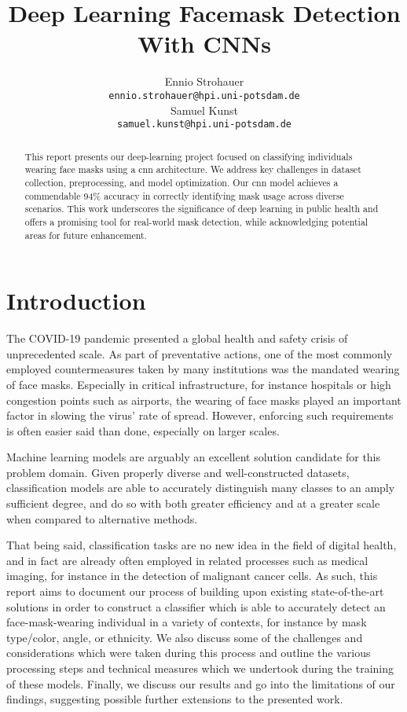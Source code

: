 \documentclass{article}
\title{Deep Learning Facemask Detection With CNNs}
\author{
  Ennio Strohauer\\
  \texttt{ennio.strohauer@hpi.uni-potsdam.de} \\
  \And
  Samuel Kunst\\
  \texttt{samuel.kunst@hpi.uni-potsdam.de} \\
}
\begin{document}

\maketitle

\begin{abstract}
This report presents our deep-learning project focused on classifying individuals wearing face masks using a \gls{cnn} architecture. We address key challenges in dataset collection, preprocessing, and model optimization. Our \gls{cnn} model achieves a commendable 94\% accuracy in correctly identifying mask usage across diverse scenarios. This work underscores the significance of deep learning in public health and offers a promising tool for real-world mask detection, while acknowledging potential areas for future enhancement.
\end{abstract}

\glsresetall

\section{Introduction}
\label{intro}

The COVID-19 pandemic presented a global health and safety crisis of unprecedented scale. As part of preventative actions, one of the most commonly employed countermeasures taken by many institutions was the mandated wearing of face masks. Especially in critical infrastructure, for instance hospitals or high congestion points such as airports, the wearing of face masks played an important factor in slowing the virus' rate of spread. However, enforcing such requirements is often easier said than done, especially on larger scales.

Machine learning models are arguably an excellent solution candidate for this problem domain. Given properly diverse and well-constructed datasets, classification models are able to accurately distinguish many classes to an amply sufficient degree, and do so with both greater efficiency and at a greater scale when compared to alternative methods.

That being said, classification tasks are no new idea in the field of digital health, and in fact are already often employed in related processes such as medical imaging, for instance in the detection of malignant cancer cells. As such, this report aims to document our process of building upon existing state-of-the-art solutions in order to construct a classifier which is able to accurately detect an face-mask-wearing individual in a variety of contexts, for instance by mask type/color, angle, or ethnicity. We also discuss some of the challenges and considerations which were taken during this process and outline the various processing steps and technical measures which we undertook during the training of these models. Finally, we discuss our results and go into the limitations of our findings, suggesting possible further extensions to the presented work.
\end{document}
